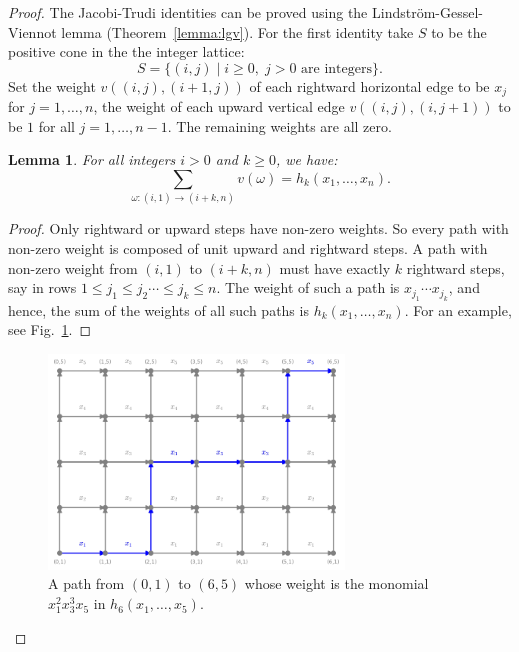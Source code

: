 \documentclass[11pt]{amsproc}
\newtheorem{lemma}[theorem]{Lemma}
\theoremstyle{definition}
\theoremstyle{example}
\begin{document}
\begin{proof}
  The Jacobi-Trudi identities can be proved using the Lindstr\"om-Gessel-Viennot lemma (Theorem~\ref{lemma:lgv}).
  For the first identity take $S$ to be the positive cone in the the integer lattice:
  \begin{displaymath}
    S = \{(i,j)\mid i\geq 0,\; j>0 \text{ are integers}\}.
  \end{displaymath}
  Set the weight $v((i,j), (i+1,j))$ of each rightward horizontal edge to be $x_j$ for $j=1,\dotsc, n$, the weight of each upward vertical edge $v((i,j), (i,j+1))$ to be $1$ for all $j=1,\dotsc,n-1$.
  The remaining weights are all zero.
  \begin{lemma}
    \label{lemma:entry}
    For all integers $i>0$ and $k\geq 0$, we have:
    \begin{displaymath}
      \sum_{\omega:(i, 1)\to (i+k, n)} v(\omega) = h_k(x_1,\dotsc,x_n).
    \end{displaymath}
  \end{lemma}
  \begin{proof}
    Only rightward or upward steps have non-zero weights.
    So every path with non-zero weight is composed of unit upward and rightward steps.
    A path with non-zero weight from $(i,1)$ to $(i+k, n)$ must have exactly $k$ rightward steps, say in rows $1\leq j_1\leq j_2 \dotsb \leq j_k\leq n$.
    The weight of such a path is $x_{j_1}\dotsb x_{j_k}$, and hence, the sum of the weights of all such paths is $h_k(x_1,\dotsc, x_n)$. For an example, see Fig.~\ref{fig:path_example}.
  \end{proof}
  \begin{figure}
    \centering
    \includegraphics[width=0.7\textwidth]{path_example.png}
    \caption{A path from $(0, 1)$ to $(6, 5)$ whose weight is the monomial $x_1^2x_3^3x_5$ in $h_6(x_1,\dotsc,x_5)$.}
    \label{fig:path_example}
  \end{figure}

\end{proof}
\end{document}
